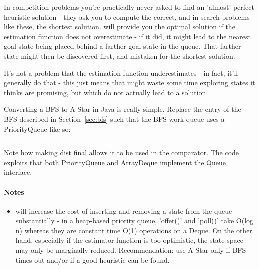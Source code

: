 In competition problems you're practically never asked to find an 'almost'
perfect heuristic solution - they ask
you to compute the correct, and in search problems like these, the
shortest solution.  \astar will provide you the optimal
solution if the estimation function does not overestimate  - if it
did, it might lead to the nearest goal state being placed behind a
farther goal state in the queue.  That farther state might then be
discovered first, and mistaken for the shortest solution.

It's not a problem that the estimation function underestimates - in fact,
it'll generally do that - this just means that \astar might waste some
time exploring states it thinks are promising, but which do not actually
lead to a solution.

Converting a BFS to A-Star in Java is really simple.  Replace the entry
of the BFS described in Section~\ref{sec:bfs} such that the BFS work
queue uses a PriorityQueue like so:

\inputminted[fontsize=\footnotesize,linenos=true]{java}{code/astar.java}

Note how making dist final allows it to be used in the comparator.
The code exploits that both PriorityQueue and ArrayDeque implement the
Queue interface.

\paragraph{Notes}  
\begin{itemize}
\item
\astar will increase the cost of inserting and removing a state from the queue
substantially - in a heap-based priority queue, 'offer()' and 'poll()' take O(log n) whereas 
they are constant time O(1) operations on a Deque.  On the other hand, especially if the
estimator function is too optimistic, the state space may only be marginally reduced.
Recommendation: use A-Star only if BFS times out and/or if a good heuristic
can be found.

\end{itemize}
